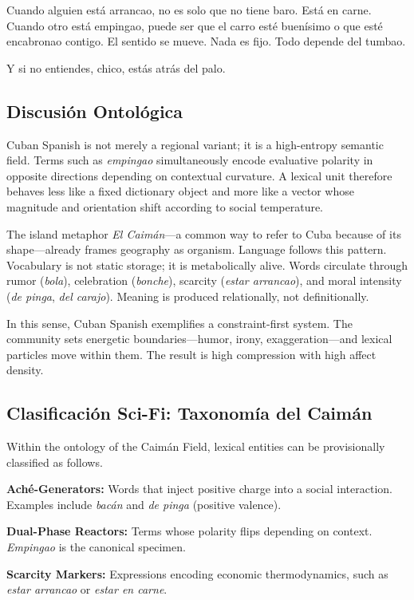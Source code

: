 \documentclass[12pt]{article}
\begin{document}
Cuando alguien está arrancao, no es solo que no tiene baro. Está en carne. Cuando otro está empingao, puede ser que el carro esté buenísimo o que esté encabronao contigo. El sentido se mueve. Nada es fijo. Todo depende del tumbao.

Y si no entiendes, chico, estás atrás del palo.

\subsection*{Discusión Ontológica}

Cuban Spanish is not merely a regional variant; it is a high-entropy semantic field. Terms such as \textit{empingao} simultaneously encode evaluative polarity in opposite directions depending on contextual curvature. A lexical unit therefore behaves less like a fixed dictionary object and more like a vector whose magnitude and orientation shift according to social temperature.

The island metaphor \textit{El Caimán}---a common way to refer to Cuba because of its shape---already frames geography as organism. Language follows this pattern. Vocabulary is not static storage; it is metabolically alive. Words circulate through rumor (\textit{bola}), celebration (\textit{bonche}), scarcity (\textit{estar arrancao}), and moral intensity (\textit{de pinga}, \textit{del carajo}). Meaning is produced relationally, not definitionally.

In this sense, Cuban Spanish exemplifies a constraint-first system. The community sets energetic boundaries---humor, irony, exaggeration---and lexical particles move within them. The result is high compression with high affect density.

\subsection*{Clasificación Sci-Fi: Taxonomía del Caimán}

Within the ontology of the Caimán Field, lexical entities can be provisionally classified as follows.

\textbf{Aché-Generators:} Words that inject positive charge into a social interaction. Examples include \textit{bacán} and \textit{de pinga} (positive valence).

\textbf{Dual-Phase Reactors:} Terms whose polarity flips depending on context. \textit{Empingao} is the canonical specimen.

\textbf{Scarcity Markers:} Expressions encoding economic thermodynamics, such as \textit{estar arrancao} or \textit{estar en carne}.
\end{document}
